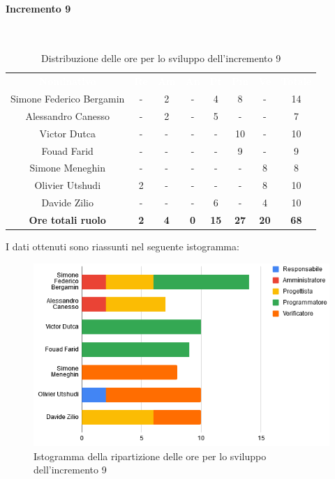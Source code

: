 \paragraph*{Incremento 9}\mbox{} \\
\begin{table}[H]
\centering\renewcommand{\arraystretch}{1.5}
\caption{Distribuzione delle ore per lo sviluppo dell'incremento 9}
\vspace{0.2cm}
\begin{tabular}{ c c c c c c c c }
\rowcolor{redafk}
\textcolor{white}{\textbf{Nominativo}} & \textcolor{white}{\textbf{Re}} &
\textcolor{white}{\textbf{Am}} & \textcolor{white}{\textbf{An}} &
\textcolor{white}{\textbf{Pt}} & \textcolor{white}{\textbf{Pm}} &
\textcolor{white}{\textbf{Ve}} & \textcolor{white}{\textbf{Totale}} \\
Simone Federico Bergamin & - & 2 & - & 4 & 8 & - & 14\\
Alessandro Canesso & - & 2 & - & 5 & - & - & 7 \\
Victor Dutca & - & - & - & - & 10 & - & 10 \\
Fouad Farid & - & - & - & - & 9 & - & 9 \\
Simone Meneghin & - & - & - & - & - & 8 & 8 \\
Olivier Utshudi & 2 & - & - & - & - & 8 & 10 \\
Davide Zilio & - & - & - & 6 & - & 4 & 10 \\
\rowcolor{lastrowcolor}
\textbf{Ore totali ruolo} & \textbf{2} & \textbf{4} & \textbf{0} & \textbf{15} & \textbf{27} & \textbf{20} & \textbf{68} \\
\end{tabular}
\end{table}

I dati ottenuti sono riassunti nel seguente istogramma:
\begin{figure}[H]
\centering
\includegraphics[scale=0.60]{img/grafici/tabella_inc9.png}
\caption{Istogramma della ripartizione delle ore per lo sviluppo dell'incremento 9}
\end{figure}

